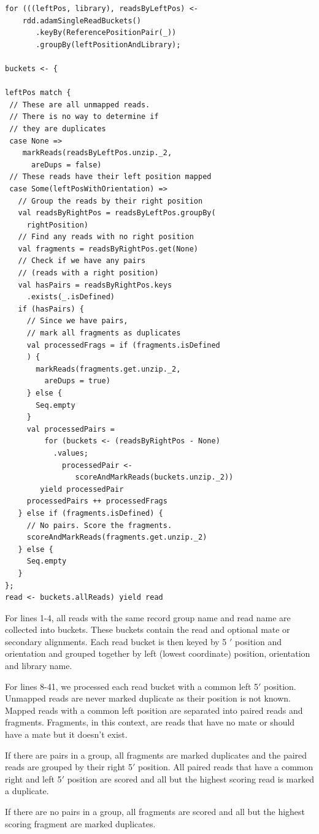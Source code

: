 \documentclass{acm_proc_article-sp}
\begin{document}
\begin{lstlisting}
for (((leftPos, library), readsByLeftPos) <- 
    rdd.adamSingleReadBuckets()
       .keyBy(ReferencePositionPair(_))
       .groupBy(leftPositionAndLibrary);

buckets <- {

leftPos match {
 // These are all unmapped reads. 
 // There is no way to determine if
 // they are duplicates
 case None =>
    markReads(readsByLeftPos.unzip._2,
      areDups = false)
 // These reads have their left position mapped
 case Some(leftPosWithOrientation) =>
   // Group the reads by their right position
   val readsByRightPos = readsByLeftPos.groupBy(
     rightPosition)
   // Find any reads with no right position
   val fragments = readsByRightPos.get(None)
   // Check if we have any pairs
   // (reads with a right position)
   val hasPairs = readsByRightPos.keys
     .exists(_.isDefined)
   if (hasPairs) {
     // Since we have pairs,
     // mark all fragments as duplicates
     val processedFrags = if (fragments.isDefined
     ) {
       markReads(fragments.get.unzip._2,
         areDups = true)
     } else {
       Seq.empty
     }
     val processedPairs = 
         for (buckets <- (readsByRightPos - None)
           .values;
             processedPair <- 
                scoreAndMarkReads(buckets.unzip._2)) 
        yield processedPair
     processedPairs ++ processedFrags
   } else if (fragments.isDefined) {
     // No pairs. Score the fragments.
     scoreAndMarkReads(fragments.get.unzip._2)
   } else {
     Seq.empty
   }
};
read <- buckets.allReads) yield read
\end{lstlisting}

For lines 1-4, all reads with the same record group name and read name are collected 
into buckets. These buckets contain the read and optional mate or secondary alignments.
Each read bucket is then keyed by 5 $'$ position and orientation and grouped together by
left (lowest coordinate) position, orientation and library name.

For lines 8-41, we processed each read bucket with a common left 5$'$ position. Unmapped
reads are never marked duplicate as their position is not known. Mapped reads with a common
left position are separated into paired reads and fragments. Fragments, in this context,
are reads that have no mate or should have a mate but it doesn't exist.

If there are pairs in a group, all fragments are marked duplicates and the paired reads are grouped
by their right 5$'$ position. All paired reads that have a common right and left 5$'$
position are scored and all but the highest scoring read is marked a duplicate.

If there are no pairs in a group, all fragments are scored and all but the highest scoring fragment
are marked duplicates.

\end{document}
